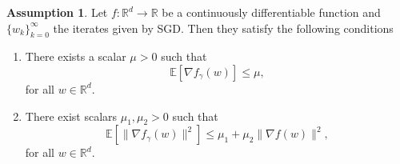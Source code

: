 \documentclass[12pt]{article}
\theoremstyle{definition}
\newtheorem{assumption}[theorem]{Assumption}
\numberwithin{equation}{section}
\newcommand{\R}{\mathbb{R}}
\newcommand{\ev}[1]{\mathbb{E}\left[{#1}\right]}
\begin{document}
\begin{assumption}
  Let $f : \R^d \rightarrow \R$ be a continuously differentiable function and $\{w_k\}_{k=0}^\infty$ the iterates given by SGD. Then they satisfy the following conditions
  \begin{enumerate}
    \item There exists a scalar $\mu > 0$ such that 
    \begin{equation*}
      \ev{\nabla f_{\gamma}(w)} \leq \mu,
    \end{equation*}
    for all $w \in \R^d$.
    \item There exist scalars $\mu_1, \mu_2 > 0$ such that 
    \begin{equation*}
      \label{eq:variance_linear_growth}
      \ev{\lVert \nabla f_{\gamma}(w) \rVert^2} \leq \mu_1 + \mu_2 \lVert \nabla f(w) \rVert^2,
    \end{equation*}
    for all $w \in \R^d$.
  \end{enumerate}
\end{assumption}
\end{document}
